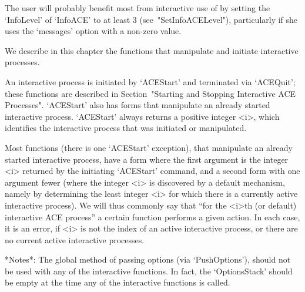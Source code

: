 

The user will probably benefit most from interactive use of {\ACE}  by
setting   the   `InfoLevel'   of   `InfoACE'    to    at    least    3
(see~"SetInfoACELevel"),  particularly  if  she  uses  the  `messages'
option with a non-zero value.

We describe in this chapter the functions that manipulate and initiate
interactive {\ACE} processes.

An  interactive  {\ACE}  process  is  initiated  by   `ACEStart'   and
terminated  via  `ACEQuit';   these   functions   are   described   in
Section~"Starting and Stopping Interactive ACE Processes".  `ACEStart'
also has forms that manipulate an already started  interactive  {\ACE}
process. `ACEStart' always  returns  a  positive  integer  <i>,  which
identifies the  interactive  {\ACE}  process  that  was  initiated  or
manipulated.

Most functions (there is one `ACEStart' exception), that manipulate an
already started interactive {\ACE} process,  have  a  form  where  the
first  argument  is  the  integer  <i>  returned  by  the   initiating
`ACEStart' command, and a second form with one argument  fewer  (where
the integer <i> is  discovered  by  a  default  mechanism,  namely  by
determining the least integer <i>  for  which  there  is  a  currently
active interactive {\ACE} process). We will  thus  commonly  say  that
``for the <i>th (or default) interactive  {ACE}  process''  a  certain
function performs a given action. In each case, it is an error, if <i>
is not the index of an active interactive process,  or  there  are  no
current active interactive processes.

*Notes*: 
The global method of passing options (via `PushOptions'),  should  not
be  used  with  any  of  the  interactive  functions.  In  fact,   the
`OptionsStack' should be empty at the  time  any  of  the  interactive
functions is called.

